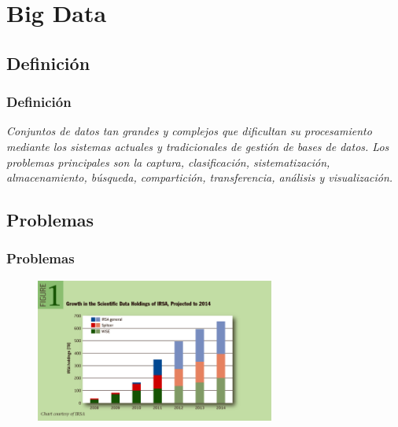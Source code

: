 \documentclass[serif,12pt]{beamer}
\begin{document}
\section{Big Data}

\subsection{Definición}
\begin{frame}
\frametitle{Definición}

\begin{shaded}
\emph{Conjuntos de datos tan grandes y complejos que dificultan su procesamiento mediante los sistemas actuales y tradicionales de gestión de bases de datos. Los problemas principales son la captura, clasificación, sistematización, almacenamiento, búsqueda, compartición, transferencia, análisis y visualización.}
\end{shaded}
\end{frame}
\subsection{Problemas}

\begin{frame}
\frametitle{Problemas}

\begin{figure}
\centering
\includegraphics[width=0.7\textwidth, height=0.7\textheight]{images/data_rates.png} 
\label{fig:data_rates}
\end{figure}


\end{frame}
\end{document}
